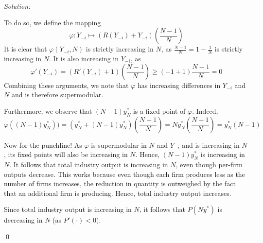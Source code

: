 \documentclass[12pt]{article}
\newenvironment{problem}[2][Problem]{\begin{trivlist}
\item[\hskip \labelsep {\bfseries #1}\hskip \labelsep {\bfseries #2.}]}{\end{trivlist}}
\newenvironment{sol}
    {\emph{Solution:}
    }
    {
    \qed
    }
\begin{document}
\begin{sol}
\begin{enumerate}[label=\alph*)]
    To do so, we define the mapping 
    \[\varphi : Y_{-i} \mapsto (R(Y_{-i}) + Y_{-i}) \left(\frac{N-1}{N}\right)\]
    It is clear that $\varphi(Y_{-i}, N)$ is strictly increasing in $N$, as $\frac{N-1}{N} = 1 - \frac{1}{N}$ is strictly increasing in $N$. It is also increasing in $Y_{-i}$, as 
    \[\varphi'(Y_{-i}) = (R'(Y_{-i}) + 1)\left( \frac{N-1}{N}\right) \geq (-1 + 1) \frac{N-1}{N} = 0\]
    Combining these arguments, we note that $\varphi$ has increasing differences in $Y_{-i}$ and $N$ and is therefore supermodular. 
    
    Furthermore, we observe that $(N-1)y^*_{N}$ is a fixed point of $\varphi$. Indeed,
    \[\varphi((N-1)y^*_N)) = (y^*_N + (N-1)y^*_N)\left(\frac{N-1}{N}\right) = N y^*_N \left( \frac{N-1}{N}\right) = y^*_N (N-1)\]
    
    Now for the punchline! As $\varphi$ is supermodular in $N$ and $Y_{-i}$ and is increasing in $N$, its fixed points will also be increasing in $N$. Hence, $(N-1) y^*_N$ is increasing in $N$. It follows that total industry output is increasing in $N$, even though per-firm outputs decrease. This works because even though each firm produces less as the number of firms increases, the reduction in quantity is outweighed by the fact that an additional firm is producing. Hence, total industry output increases. 

    Since total industry output is increasing in $N$, it follows that $P(Ny^*)$ is decreasing in $N$ (as $P'(\cdot) < 0)$.
\end{enumerate}
\end{sol}
\begin{problem}{2}
\end{problem}
\end{document}
